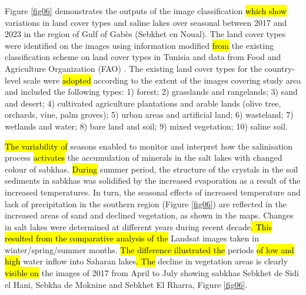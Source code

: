 \documentclass[land,article,submit,pdftex,moreauthors]{Definitions/mdpi}
\begin{document}
Figure \ref{fig06} demonstrates the outputs of the image classification \hl{which show} variations in land cover types and saline lakes over seasonal between 2017 and 2023 in the region of Gulf of Gabès (Sebkhet en Noual). The land cover types were identified on the images using information\hl{ }modified \hl{from} the existing classification scheme on land cover types in Tunisia \cite{plants10102031} and data from Food and Agriculture Organization (FAO) \cite{FAO}. The existing land cover types for the country-level scale were \hl{adopted} according to the extent of the images covering study area and included the following types: 1) forest; 2) grasslands and rangelands; 3) sand and desert; 4) cultivated agriculture plantations and arable lands (olive tree, orchards, vine, palm groves); 5) urban areas and artificial land; 6) wasteland; 7) wetlands and water; 8) bare land and soil; 9) mixed vegetation; 10) saline soil. 

\hl{The variability of} seasons enabled to monitor and interpret how the salinisation process \hl{activates} the accumulation of minerals in the salt lakes with changed colour of sabkhas. \hl{During }summer period, the structure of the crystals in the soil sediments in sabkhas was solidified by the increased evaporation as a result of the increased temperatures. In turn, the seasonal effects of increased temperature and lack of precipitation in the southern region (Figure \ref{fig06}) are reflected in the increased areas of sand and declined vegetation, as shown in the maps. Changes in salt lakes were determined at different years during recent decade\hl{. This resulted from the comparative analysis of the }Landsat images taken in winter/spring/summer months. \hl{The difference illustrated the} periods \hl{of low and high }water inflow into Saharan lakes\hl{. The} decline in vegetation areas is clearly \hl{visible on} the images of 2017 from April to July showing sabkhas Sebkhet de Sidi el Hani, Sebkha de Moknine  and Sebkhet El Rharra, Figure \ref{fig06}. 
\end{document}
